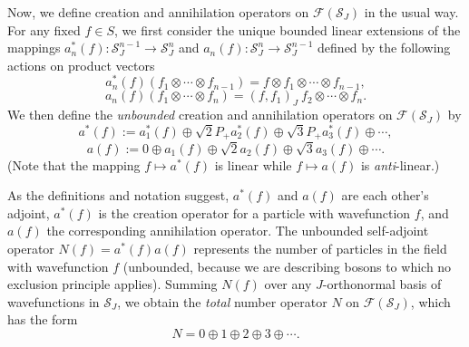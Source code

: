 \documentclass[12pt]{article}
\theoremstyle{remark}
\theoremstyle{definition}
\newcommand{\hil}[1]{\mathcal{#1}}
\begin{document}
Now, we define creation and annihilation
operators on $\hil{F}(\hil{S}_{J})$ in the 
usual way.  For any fixed $f\in S$, we first consider the unique bounded linear 
extensions of the mappings 
$a^{*}_{n}(f):\hil{S}_{J}^{n-1}\rightarrow \hil{S}_{J}^{n}$ and 
$a_{n}(f):\hil{S}_{J}^{n}\rightarrow \hil{S}_{J}^{n-1}$ defined by the following 
actions on product vectors 
\begin{equation}
  a^{*}_{n}(f)(f_{1}\otimes\cdots\otimes f_{n-1})=
  f\otimes f_{1}\otimes\cdots\otimes f_{n-1},
  \end{equation}
  \begin{equation}
  a_{n}(f)(f_{1}\otimes\cdots\otimes f_{n})=
  (f,f_{1})_{J}\ f_{2}\otimes\cdots\otimes f_{n}.
  \end{equation}
We then define the \emph{unbounded} creation and annihilation 
operators on $\hil{F}(\hil{S}_{J})$ by
\begin{equation}
  a^{*}(f):=a^{*}_{1}(f)\oplus \sqrt{2} P_{+}a^{*}_{2}(f)\oplus \sqrt{3} 
  P_{+}a^{*}_{3}(f)\oplus\cdots,
  \end{equation}
\begin{equation}
  a(f):=0\oplus a_{1}(f)\oplus \sqrt{2} a_{2}(f)\oplus \sqrt{3} a_{3}(f)\oplus\cdots.
  \end{equation}
  (Note that the mapping $f\mapsto a^{*}(f)$ is linear while $f\mapsto 
  a(f)$ is \emph{anti}-linear.) 
  
  As the definitions and notation suggest, $a^{*}(f)$ and $a(f)$ are
  each other's adjoint, $a^{*}(f)$ is the creation operator for a
  particle with wavefunction $f$, and $a(f)$ the corresponding
  annihilation operator.  The unbounded self-adjoint operator
  $N(f)=a^{*}(f)a(f)$ represents the number of particles in the field
  with wavefunction $f$ (unbounded, because we are describing bosons
  to which no exclusion principle applies).  Summing $N(f)$ over any
  $J$-orthonormal basis of wavefunctions in $\hil{S}_{J}$, we obtain
  the \emph{total} number operator $N$ on $\hil{F}(\hil{S}_{J})$,
  which has the form
\begin{equation} N=0\oplus 1\oplus
  2\oplus 3 \oplus \cdots .\end{equation} 
\end{document}
